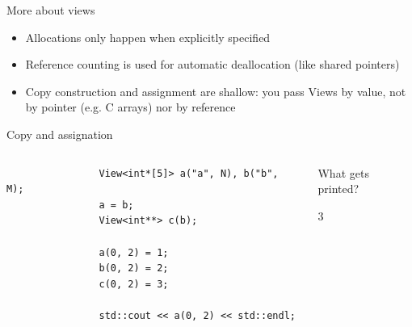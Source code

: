 \documentclass[
    aspectratio=169,
    handout,
]{beamer}
\begin{document}

\begin{frame}{More about views}
    \begin{itemize}
        \item Allocations only happen when explicitly specified
        \pause
        \item Reference counting is used for automatic deallocation (like shared pointers)
        \pause
        \item Copy construction and assignment are shallow: you pass Views by value, not by pointer (e.g. C arrays) nor by reference
    \end{itemize}
\end{frame}


\begin{frame}[fragile]{Copy and assignation}
    \begin{columns}
        \begin{column}{0.6\linewidth}
            \begin{verbatim}
                View<int*[5]> a("a", N), b("b", M);
                a = b;
                View<int**> c(b);

                a(0, 2) = 1;
                b(0, 2) = 2;
                c(0, 2) = 3;

                std::cout << a(0, 2) << std::endl;
            \end{verbatim}
        \end{column}
        \begin{column}{0.4\linewidth}
             What gets printed?

            \pause

             3
        \end{column}
    \end{columns}
\end{frame}

\end{document}
